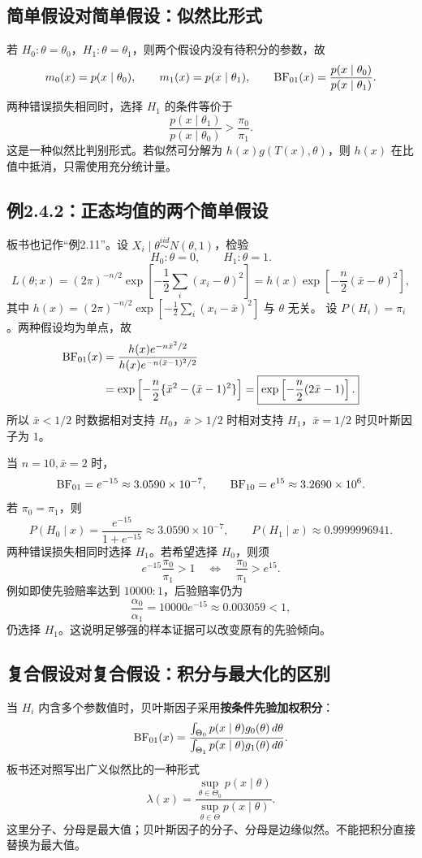 \subsection{简单假设对简单假设：似然比形式}
若 $H_0:\theta=\theta_0$，$H_1:\theta=\theta_1$，则两个假设内没有待积分的参数，故
\[
m_0(x)=p(x\mid\theta_0),\qquad m_1(x)=p(x\mid\theta_1),\qquad
\operatorname{BF}_{01}(x)=\frac{p(x\mid\theta_0)}{p(x\mid\theta_1)}.
\]
两种错误损失相同时，选择 $H_1$ 的条件等价于
\[
\frac{p(x\mid\theta_1)}{p(x\mid\theta_0)}>\frac{\pi_0}{\pi_1}.
\]
这是一种似然比判别形式。若似然可分解为 $h(x)g(T(x),\theta)$，则 $h(x)$ 在比值中抵消，只需使用充分统计量。

\subsection{例2.4.2：正态均值的两个简单假设}
板书也记作“例2.11”。设 $X_i\mid\theta\overset{iid}{\sim}N(\theta,1)$，检验
\[
H_0:\theta=0,\qquad H_1:\theta=1.
\]
\[
L(\theta;x)=(2\pi)^{-n/2}\exp\left[-\frac12\sum_i(x_i-\theta)^2\right]
=h(x)\exp\left[-\frac n2(\bar x-\theta)^2\right],
\]
其中 $h(x)=(2\pi)^{-n/2}\exp[-\frac12\sum_i(x_i-\bar x)^2]$ 与 $\theta$ 无关。
设 $P(H_i)=\pi_i$。两种假设均为单点，故
\begin{align*}
\operatorname{BF}_{01}(x)
&=\frac{h(x)e^{-n\bar x^2/2}}{h(x)e^{-n(\bar x-1)^2/2}}\\
&=\exp\left[-\frac n2\{\bar x^2-(\bar x-1)^2\}\right]
=\boxed{\exp\left[-\frac n2(2\bar x-1)\right].}
\end{align*}
所以 $\bar x<1/2$ 时数据相对支持 $H_0$，$\bar x>1/2$ 时相对支持 $H_1$，$\bar x=1/2$ 时贝叶斯因子为 $1$。

当 $n=10,\bar x=2$ 时，
\[
\operatorname{BF}_{01}=e^{-15}\approx3.0590\times10^{-7},\qquad
\operatorname{BF}_{10}=e^{15}\approx3.2690\times10^6.
\]
若 $\pi_0=\pi_1$，则
\[
P(H_0\mid x)=\frac{e^{-15}}{1+e^{-15}}\approx3.0590\times10^{-7},
\qquad P(H_1\mid x)\approx0.9999996941.
\]
两种错误损失相同时选择 $H_1$。若希望选择 $H_0$，则须
\[
e^{-15}\frac{\pi_0}{\pi_1}>1
\quad\Longleftrightarrow\quad\frac{\pi_0}{\pi_1}>e^{15}.
\]
例如即使先验赔率达到 $10000:1$，后验赔率仍为
\[
\frac{\alpha_0}{\alpha_1}=10000e^{-15}\approx0.003059<1,
\]
仍选择 $H_1$。这说明足够强的样本证据可以改变原有的先验倾向。

\subsection{复合假设对复合假设：积分与最大化的区别}
当 $H_i$ 内含多个参数值时，贝叶斯因子采用\textbf{按条件先验加权积分}：
\[
\operatorname{BF}_{01}(x)=\frac{\int_{\Theta_0}p(x\mid\theta)g_0(\theta)\,d\theta}
{\int_{\Theta_1}p(x\mid\theta)g_1(\theta)\,d\theta}.
\]
板书还对照写出广义似然比的一种形式
\[
\lambda(x)=\frac{\sup_{\theta\in\Theta_0}p(x\mid\theta)}
{\sup_{\theta\in\Theta}p(x\mid\theta)}.
\]
这里分子、分母是最大值；贝叶斯因子的分子、分母是边缘似然。不能把积分直接替换为最大值。

